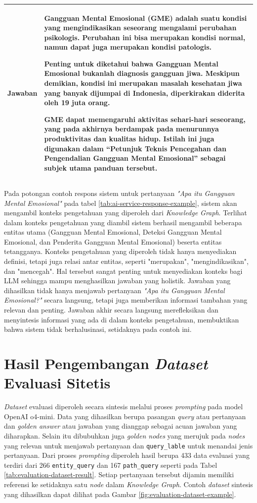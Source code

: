 \begin{longtable}{|p{}|p{}|}
	Jawaban                      &
	Gangguan Mental Emosional (GME) adalah suatu kondisi yang mengindikasikan seseorang mengalami perubahan psikologis. Perubahan ini bisa merupakan kondisi normal, namun dapat juga merupakan kondisi patologis.

	Penting untuk diketahui bahwa Gangguan Mental Emosional \textbf{bukanlah diagnosis gangguan jiwa}. Meskipun demikian, kondisi ini merupakan masalah kesehatan jiwa yang banyak dijumpai di Indonesia, diperkirakan diderita oleh 19 juta orang.

	GME dapat memengaruhi aktivitas sehari-hari seseorang, yang pada akhirnya berdampak pada menurunnya produktivitas dan kualitas hidup. Istilah ini juga digunakan dalam ``Petunjuk Teknis Pencegahan dan Pengendalian Gangguan Mental Emosional'' sebagai subjek utama panduan tersebut.
	\\
	\hline
\end{longtable}

Pada potongan contoh respons sistem untuk pertanyaan \textit{"Apa itu Gangguan Mental Emosional"} pada tabel \ref{tab:ai-service-response-example}, sistem akan mengambil konteks pengetahuan yang diperoleh dari \textit{Knowledge Graph}.
Terlihat dalam konteks pengetahuan yang diambil sistem berhasil mengambil beberapa entitas utama (Gangguan Mental Emosional, Deteksi Gangguan Mental Emosional, dan Penderita Gangguan Mental Emosional) beserta entitas tetangganya.
Konteks pengetahuan yang diperoleh tidak hanya menyediakan definisi, tetapi juga relasi antar entitas, seperti "merupakan", "mengindikasikan", dan "mencegah".
Hal tersebut sangat penting untuk menyediakan konteks bagi LLM sehingga mampu menghasilkan jawaban yang holistik.
Jawaban yang dihasilkan tidak hanya menjawab pertanyaan \textit{"Apa itu Gangguan Mental Emosional?"} secara langsung, tetapi juga memberikan informasi tambahan yang relevan dan penting.
Jawaban akhir secara langsung merefleksikan dan menyintesis informasi yang ada di dalam konteks pengetahuan, membuktikan bahwa sistem tidak berhalusinasi, setidaknya pada contoh ini.

\section{Hasil Pengembangan \textit{Dataset} Evaluasi Sitetis}
\textit{Dataset} evaluasi diperoleh secara sintesis melalui proses \textit{prompting} pada model OpenAI o4-mini.
Data yang dihasilkan berupa pasangan \textit{query} atau pertanyaan dan \textit{golden answer} atau jawaban yang dianggap sebagai acuan jawaban yang diharapkan.
Selain itu dibubuhkan juga \textit{golden nodes} yang merujuk pada \textit{nodes} yang relevan untuk menjawab pertanyaan dan \texttt{query\_lable} untuk menandai jenis pertanyaan.
Dari proses \textit{prompting} diperoleh hasil berupa 433 data evaluasi yang terdiri dari 266 \texttt{entity\_query} dan 167 \texttt{path\_query} seperti pada Tabel \ref{tab:evaluation-dataset-result}.
Setiap pertanyaan tersebut dijamin memiliki referensi ke setidaknya satu \textit{node} dalam \textit{Knowledge Graph}.
Contoh \textit{dataset} sintesis yang dihasilkan dapat dilihat pada Gambar \ref{fig:evaluation-dataset-example}.

